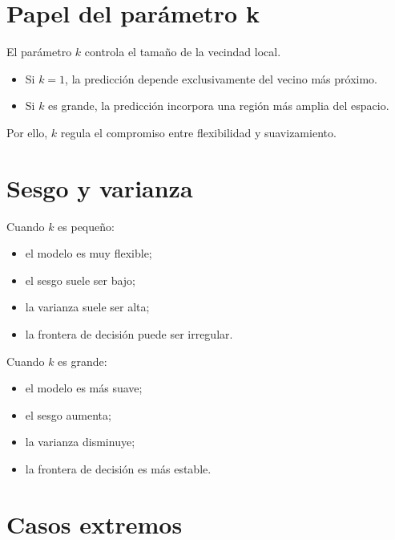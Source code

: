 \documentclass[
  spanish,
  10.5pt,
  letterpaper,
  DIV=11,
  numbers=noendperiod,
  oneside,
  open=any]{scrreprt}
\providecommand{\tightlist}{%
  \setlength{\itemsep}{0pt}\setlength{\parskip}{0pt}}
\theoremstyle{definition}
\theoremstyle{definition}
\theoremstyle{plain}
\theoremstyle{remark}
\begin{document}
\section*{Papel del parámetro k}\label{papel-del-paruxe1metro-k}


El parámetro \(k\) controla el tamaño de la vecindad local.

\begin{itemize}
\tightlist
\item
  Si \(k=1\), la predicción depende exclusivamente del vecino más
  próximo.
\item
  Si \(k\) es grande, la predicción incorpora una región más amplia del
  espacio.
\end{itemize}

Por ello, \(k\) regula el compromiso entre flexibilidad y suavizamiento.

\section*{Sesgo y varianza}\label{sesgo-y-varianza-1}


Cuando \(k\) es pequeño:

\begin{itemize}
\tightlist
\item
  el modelo es muy flexible;
\item
  el sesgo suele ser bajo;
\item
  la varianza suele ser alta;
\item
  la frontera de decisión puede ser irregular.
\end{itemize}

Cuando \(k\) es grande:

\begin{itemize}
\tightlist
\item
  el modelo es más suave;
\item
  el sesgo aumenta;
\item
  la varianza disminuye;
\item
  la frontera de decisión es más estable.
\end{itemize}

\section*{Casos extremos}\label{casos-extremos}
\end{document}

